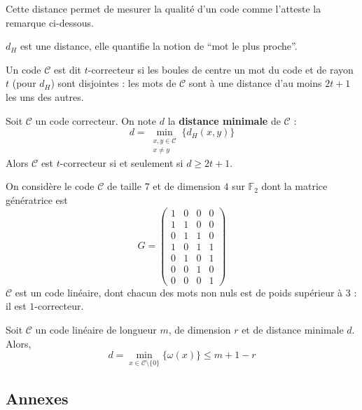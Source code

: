 	Cette distance permet de mesurer la qualité d'un code comme l'atteste la remarque ci-dessous.

	\begin{remark}
		$d_H$ est une distance, elle quantifie la notion de ``mot le plus proche''.
	\end{remark}

	\begin{definition}
		Un code $\mathcal{C}$ est dit $t$-correcteur si les boules de centre un mot du code et de rayon $t$ (pour $d_H$) sont disjointes : les mots de $\mathcal{C}$ sont à une distance d'au moins $2t+1$ les uns des autres.
	\end{definition}

	\begin{proposition}
		Soit $\mathcal{C}$ un code correcteur. On note $d$ la \textbf{distance minimale} de $\mathcal{C}$ :
		\[ d = \min_{\substack{x, y \in \mathcal{C} \\ x \neq y}} \{ d_H(x,y) \} \]
		Alors $\mathcal{C}$ est $t$-correcteur si et seulement si $d \geq 2t+1$.
	\end{proposition}

	\begin{example}
		On considère le code $\mathcal{C}$ de taille $7$ et de dimension $4$ sur $\mathbb{F}_2$ dont la matrice génératrice est
		\[
			G =
			\begin{pmatrix}
				1 & 0 & 0 & 0 \\
				1 & 1 & 0 & 0 \\
				0 & 1 & 1 & 0 \\
				1 & 0 & 1 & 1 \\
				0 & 1 & 0 & 1 \\
				0 & 0 & 1 & 0 \\
				0 & 0 & 0 & 1
			\end{pmatrix}
		\]
		$\mathcal{C}$ est un code linéaire, dont chacun des mots non nuls est de poids supérieur à $3$ : il est $1$-correcteur.
	\end{example}

	\begin{proposition}
		Soit $\mathcal{C}$ un code linéaire de longueur $m$, de dimension $r$ et de distance minimale $d$. Alors,
		\[ d = \min_{x \in \mathcal{C} \setminus \{ 0 \}} \{ \omega(x) \} \leq m+1-r \]
	\end{proposition}

	\newpage
	\subsection*{Annexes}

